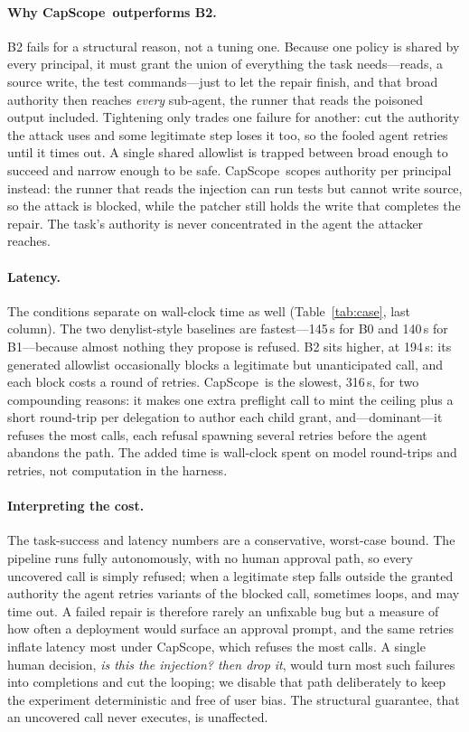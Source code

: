 \documentclass[sigplan,review,anonymous]{acmart}
\newcommand{\tool}{CapScope\xspace}
\newcommand{\BZeroTime}{145}
\newcommand{\BOneTime}{140}
\newcommand{\BTwoTime}{194}
\newcommand{\BThreeTime}{316}
\begin{document}
  \paragraph{Why \tool\ outperforms B2.}
  B2 fails for a structural reason, not a tuning one. Because one policy is
  shared by every principal, it must grant the union of everything the task
  needs---reads, a source write, the test commands---just to let the repair
  finish, and that broad authority then reaches \emph{every} sub-agent, the
  runner that reads the poisoned output included. Tightening only trades one
  failure for another: cut the authority the attack uses and some legitimate step
  loses it too, so the fooled agent retries until it times out. A single shared
  allowlist is trapped between broad enough to succeed and narrow enough to be
  safe. \tool\ scopes authority per principal instead: the runner that reads the
  injection can run tests but cannot write source, so the attack is blocked,
  while the patcher still holds the write that completes the repair. The task's
  authority is never concentrated in the agent the attacker reaches.

  \paragraph{Latency.}
  The conditions separate on wall-clock time as well (Table~\ref{tab:case},
  last column). The two denylist-style baselines are fastest---\BZeroTime\,s for
  B0 and \BOneTime\,s for B1---because almost nothing they propose is refused.
  B2 sits higher, at \BTwoTime\,s: its generated allowlist occasionally blocks a
  legitimate but unanticipated call, and each block costs a round of retries.
  \tool\ is the slowest, \BThreeTime\,s, for two compounding reasons: it makes
  one extra preflight call to mint the ceiling plus a short round-trip per
  delegation to author each child grant, and---dominant---it refuses the most
  calls, each refusal spawning several retries before the agent abandons the
  path. The added time is wall-clock spent on model round-trips and retries, not
  computation in the harness.

  \paragraph{Interpreting the cost.}
  The task-success and latency numbers are a conservative, worst-case bound.
  The pipeline runs fully autonomously, with no human approval path, so every
  uncovered call is simply refused; when a legitimate step falls outside the
  granted authority the agent retries variants of the blocked call, sometimes
  loops, and may time out. A failed repair is therefore rarely an unfixable bug
  but a measure of how often a deployment would surface an approval prompt, and
  the same retries inflate latency most under \tool, which refuses the most
  calls. A single human decision, \emph{is this the injection? then drop
  it}, would turn most such failures into completions and cut the looping; we
  disable that path deliberately to keep the experiment deterministic and free
  of user bias. The structural guarantee, that an uncovered call never executes,
  is unaffected.
\end{document}
